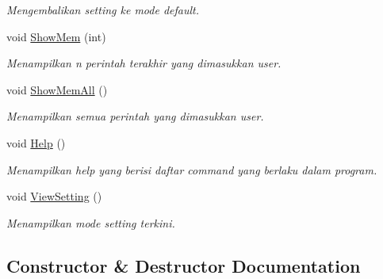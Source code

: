 \begin{DoxyCompactItemize}
\begin{DoxyCompactList}\small\item\em Mengembalikan setting ke mode default. \end{DoxyCompactList}\item 
void \hyperlink{class_class_controller_a1ac2d697860226759069791ff937220a}{Show\+Mem} (int)
\begin{DoxyCompactList}\small\item\em Menampilkan n perintah terakhir yang dimasukkan user. \end{DoxyCompactList}\item 
\hypertarget{class_class_controller_a26931f9359bf51872585e1bbfba2b881}{}void \hyperlink{class_class_controller_a26931f9359bf51872585e1bbfba2b881}{Show\+Mem\+All} ()\label{class_class_controller_a26931f9359bf51872585e1bbfba2b881}

\begin{DoxyCompactList}\small\item\em Menampilkan semua perintah yang dimasukkan user. \end{DoxyCompactList}\item 
\hypertarget{class_class_controller_ac189afe69eef22e5602ada767001cd75}{}void \hyperlink{class_class_controller_ac189afe69eef22e5602ada767001cd75}{Help} ()\label{class_class_controller_ac189afe69eef22e5602ada767001cd75}

\begin{DoxyCompactList}\small\item\em Menampilkan \textquotesingle{}help\textquotesingle{} yang berisi daftar command yang berlaku dalam program. \end{DoxyCompactList}\item 
\hypertarget{class_class_controller_ac186b106003efe4d502d9630653e84b3}{}void \hyperlink{class_class_controller_ac186b106003efe4d502d9630653e84b3}{View\+Setting} ()\label{class_class_controller_ac186b106003efe4d502d9630653e84b3}

\begin{DoxyCompactList}\small\item\em Menampilkan mode setting terkini. \end{DoxyCompactList}\end{DoxyCompactItemize}


\subsection{Constructor \& Destructor Documentation}
\hypertarget{class_class_controller_a2bfe283911ba627fb346aa9a2e149fd1}{}
